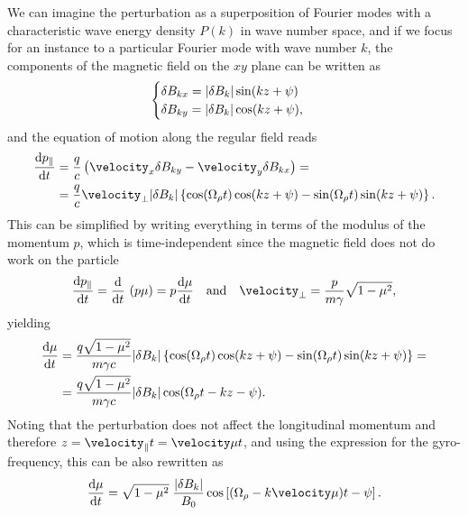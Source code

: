 We can imagine the perturbation as a superposition of Fourier modes with a characteristic
wave energy density $P(k)$ in wave number space, and if we focus for an instance to a
particular Fourier mode with wave number $k$, the components of the magnetic field on
the $xy$ plane can be written as
\begin{align*}
  \begin{cases}
    \delta B_{kx} = \abs{\delta B_k} \sin(kz + \psi)\\
    \delta B_{ky} = \abs{\delta B_k} \cos(kz + \psi),
  \end{cases}
\end{align*}
and the equation of motion along the regular field reads
\begin{align*}
  \dv{p_\parallel}{t} & =
  \frac{q}{c} \left(\velocity_x \delta B_{ky} - \velocity_y \delta B_{kx}\right) =\\
  & = \frac{q}{c} \velocity_\perp \abs{\delta B_k}
  \left\{
    \cos(\Omega_\gyrorad t) \cos(kz + \psi) -
    \sin(\Omega_\gyrorad t) \sin(kz + \psi)
  \right\}.
\end{align*}
This can be simplified by writing everything in terms of the modulus of the momentum
$p$, which is time-independent since the magnetic field does not do work on the particle
\begin{align*}
  \dv{p_\parallel}{t} = \dv{}{t}\ (p \mu) = p \dv{\mu}{t} \quad \text{and}\quad
  \velocity_\perp = \frac{p}{m \gamma} \sqrt{1 - \mu^2},
\end{align*}
yielding
\begin{align*}
  \dv{\mu}{t} & = \frac{q \sqrt{1 - \mu^2}}{m \gamma c} \abs{\delta B_k}
  \left\{
    \cos(\Omega_{\rho} t) \cos(kz + \psi) -
    \sin(\Omega_{\rho} t) \sin(kz + \psi)
  \right\} =\\
  & = \frac{q \sqrt{1 - \mu^2}}{m \gamma c} \abs{\delta B_k}
  \cos(\Omega_{\rho} t - kz - \psi).
\end{align*}
Noting that the perturbation does not affect the longitudinal momentum and therefore
$z = \velocity_\parallel t = \velocity\mu t$, and using the expression for the
gyro-frequency, this can be also rewritten as
\begin{align}\label{eq:pitch_angle_motion}
  \dv{\mu}{t} =
  \sqrt{1 - \mu^2} \; \frac{\abs{\delta B_k}}{B_0}
  \cos \left[ (\Omega_\gyrorad - k\velocity\mu) t - \psi \right].
\end{align}

